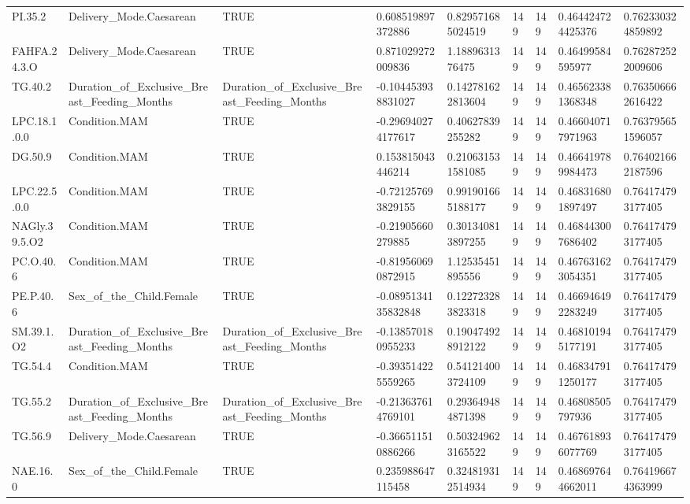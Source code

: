 \begin{longtable}{lllllllll}
PI.35.2 & Delivery\_Mode.Caesarean & TRUE & 0.608519897372886 & 0.829571685024519 & 149 & 149 & 0.464424724425376 & 0.762330324859892 \\
FAHFA.24.3.O & Delivery\_Mode.Caesarean & TRUE & 0.871029272009836 & 1.1889631376475 & 149 & 149 & 0.46499584595977 & 0.762872522009606 \\
TG.40.2 & Duration\_of\_Exclusive\_Breast\_Feeding\_Months & Duration\_of\_Exclusive\_Breast\_Feeding\_Months & -0.104453938831027 & 0.142781622813604 & 149 & 149 & 0.465623381368348 & 0.763506662616422 \\
LPC.18.1.0.0 & Condition.MAM & TRUE & -0.296940274177617 & 0.40627839255282 & 149 & 149 & 0.466040717971963 & 0.763795651596057 \\
DG.50.9 & Condition.MAM & TRUE & 0.153815043446214 & 0.210631531581085 & 149 & 149 & 0.466419789984473 & 0.764021662187596 \\
LPC.22.5.0.0 & Condition.MAM & TRUE & -0.721257693829155 & 0.991901665188177 & 149 & 149 & 0.468316801897497 & 0.764174793177405 \\
NAGly.39.5.O2 & Condition.MAM & TRUE & -0.21905660279885 & 0.301340813897255 & 149 & 149 & 0.468443007686402 & 0.764174793177405 \\
PC.O.40.6 & Condition.MAM & TRUE & -0.819560690872915 & 1.12535451895556 & 149 & 149 & 0.467631623054351 & 0.764174793177405 \\
PE.P.40.6 & Sex\_of\_the\_Child.Female & TRUE & -0.0895134135832848 & 0.122723283823318 & 149 & 149 & 0.466946492283249 & 0.764174793177405 \\
SM.39.1.O2 & Duration\_of\_Exclusive\_Breast\_Feeding\_Months & Duration\_of\_Exclusive\_Breast\_Feeding\_Months & -0.138570180955233 & 0.190474928912122 & 149 & 149 & 0.468101945177191 & 0.764174793177405 \\
TG.54.4 & Condition.MAM & TRUE & -0.393514225559265 & 0.541214003724109 & 149 & 149 & 0.468347911250177 & 0.764174793177405 \\
TG.55.2 & Duration\_of\_Exclusive\_Breast\_Feeding\_Months & Duration\_of\_Exclusive\_Breast\_Feeding\_Months & -0.213637614769101 & 0.293649484871398 & 149 & 149 & 0.46808505797936 & 0.764174793177405 \\
TG.56.9 & Delivery\_Mode.Caesarean & TRUE & -0.366511510886266 & 0.503249623165522 & 149 & 149 & 0.467618936077769 & 0.764174793177405 \\
NAE.16.0 & Sex\_of\_the\_Child.Female & TRUE & 0.235988647115458 & 0.324819312514934 & 149 & 149 & 0.468697644662011 & 0.764196674363999 \\

\end{longtable}
